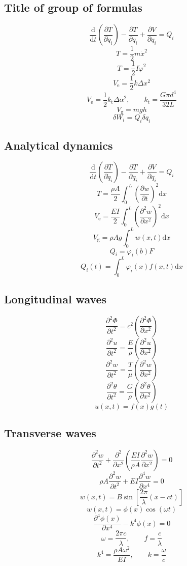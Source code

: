 \headingFormulaSheet

\subsection*{Title of group of formulas}
%
\[ \frac{\mathrm{d}}{\mathrm{d} t}\left(\frac{\partial T}{\partial\dot q_i}\right)-\frac{\partial T}{\partial q_i} + \frac{\partial V}{\partial q_i} = Q_i \]
\[ T = \frac{1}{2}m\dot x^2 \]
\[ T = \frac{1}{2}I\dot\varphi^2 \]
\[ V_\mathrm{e} = \frac{1}{2}k\Delta x^2 \]
\[ V_\mathrm{e} = \frac{1}{2}k_\mathrm{t}\Delta \alpha^2, \qquad k_\mathrm{t} = \frac{G\pi d^4}{32L} \]
\[ V_\mathrm{g} = mgh \]
\[ \delta W_i = Q_i\delta q_i \]

\subsection*{Analytical dynamics}
%
\[ \frac{\mathrm{d}}{\mathrm{d} t}\left(\frac{\partial T}{\partial\dot q_i}\right)-\frac{\partial T}{\partial q_i} + \frac{\partial V}{\partial q_i} = Q_i \]
\[ T = \frac{\rho A}{2}\int_0^L\left(\frac{\partial w}{\partial t}\right)^2\mathrm{d} x \]
\[ V_\mathrm{e} = \frac{EI}{2}\int_0^L\left(\frac{\partial^2 w}{\partial x^2}\right)^2\mathrm{d} x \]
\[ V_\mathrm{g} = \rho Ag\int_0^L w(x,t)\mathrm{d} x \]
\[ Q_i = \varphi_i(b)F \]
\[ Q_i(t) = \int_0^L \varphi_i(x)f(x,t)\mathrm{d} x \]

\subsection*{Longitudinal waves}
%
\[ \frac{\partial^2 \Phi}{\partial t^2} = c^2\left( \frac{\partial^2 \Phi}{\partial x^2} \right) \]
\[ \frac{\partial^2 u}{\partial t^2} = \frac{E}{\rho}\left( \frac{\partial^2 u}{\partial x^2} \right) \]
\[ \frac{\partial^2 w}{\partial t^2} = \frac{T}{\mu}\left( \frac{\partial^2 w}{\partial x^2} \right) \]
\[ \frac{\partial^2 \theta}{\partial t^2} = \frac{G}{\rho}\left( \frac{\partial^2 \theta}{\partial x^2} \right) \]
\[ u(x,t) = f(x)g(t) \]

\subsection*{Transverse waves}
%
\[ \frac{\partial^2 w}{\partial t^2} + \frac{\partial^2}{\partial x^2} \left(\frac{EI}{\rho A}\frac{\partial^2w}{\partial x^2}\right) = 0 \]
\[ \rho A\frac{\partial^2 w}{\partial t^2} + EI\frac{\partial^4w}{\partial x^4} = 0 \]
\[ w(x,t) = B\sin\left[ \frac{2\pi}{\lambda} (x-ct) \right] \]
\[ w(x,t) = \phi(x)\cos(\omega t) \]
\[ \frac{\partial^4\phi(x)}{\partial x^4} - k^4\phi(x) = 0 \]
\[ \omega = \frac{2\pi c}{\lambda}, \qquad f = \frac{c}{\lambda} \]
\[ k^4 = \frac{\rho A\omega^2}{EI}, \qquad k=\frac{\omega}{c} \]

